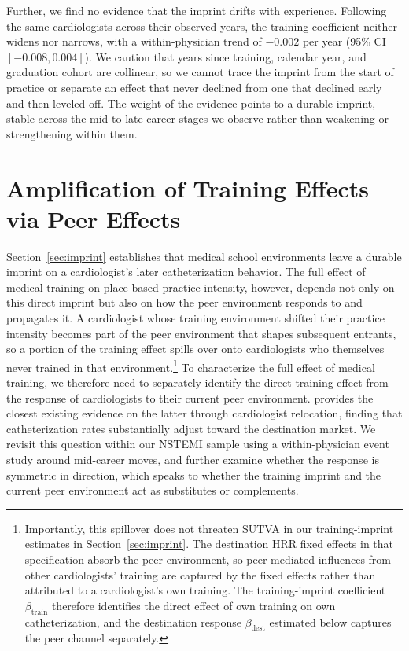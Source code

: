 \documentclass[12pt]{article}
\let\textcite\citet
\begin{document}
Further, we find no evidence that the imprint drifts with experience. Following the same cardiologists across their observed years, the training coefficient neither widens nor narrows, with a within-physician trend of $-0.002$ per year (95\% CI $[-0.008, 0.004]$). We caution that years since training, calendar year, and graduation cohort are collinear, so we cannot trace the imprint from the start of practice or separate an effect that never declined from one that declined early and then leveled off. The weight of the evidence points to a durable imprint, stable across the mid-to-late-career stages we observe rather than weakening or strengthening within them.

\section{Amplification of Training Effects via Peer Effects}\label{sec:dest}

Section~\ref{sec:imprint} establishes that medical school environments leave a durable imprint on a cardiologist's later catheterization behavior. The full effect of medical training on place-based practice intensity, however, depends not only on this direct imprint but also on how the peer environment responds to and propagates it. A cardiologist whose training environment shifted their practice intensity becomes part of the peer environment that shapes subsequent entrants, so a portion of the training effect spills over onto cardiologists who themselves never trained in that environment.\footnote{Importantly, this spillover does not threaten SUTVA in our training-imprint estimates in Section~\ref{sec:imprint}. The destination HRR fixed effects in that specification absorb the peer environment, so peer-mediated influences from other cardiologists' training are captured by the fixed effects rather than attributed to a cardiologist's own training. The training-imprint coefficient $\beta_{\text{train}}$ therefore identifies the direct effect of own training on own catheterization, and the destination response $\beta_{\text{dest}}$ estimated below captures the peer channel separately.} To characterize the full effect of medical training, we therefore need to separately identify the direct training effect from the response of cardiologists to their current peer environment. \textcite{molitor2018} provides the closest existing evidence on the latter through cardiologist relocation, finding that catheterization rates substantially adjust toward the destination market. We revisit this question within our NSTEMI sample using a within-physician event study around mid-career moves, and further examine whether the response is symmetric in direction, which speaks to whether the training imprint and the current peer environment act as substitutes or complements.
\end{document}
